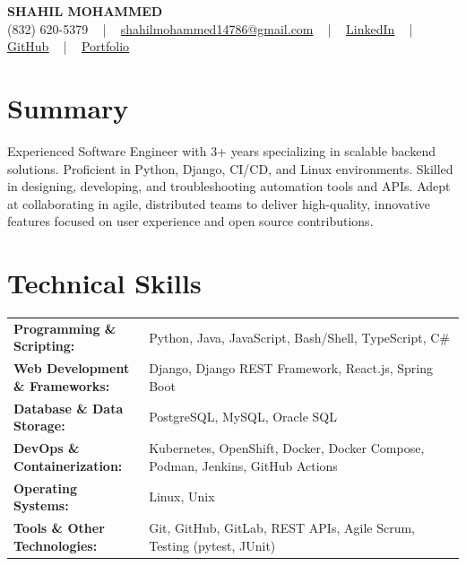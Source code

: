 \documentclass[letterpaper,11pt]{article}
\begin{document}
\begin{center}
    {\fontsize{14pt}{12pt}\selectfont \textbf{\MakeUppercase{Shahil Mohammed}}}\\ \vspace{2pt}
    \fontsize{10pt}{12pt}\selectfont (832) 620-5379 ~ | ~ \href{mailto:shahilmohammed14786@gmail.com}{shahilmohammed14786@gmail.com} ~ | ~  
    \href{https://www.linkedin.com/in/shahil-mohammed-9652931a1/}{\color{blue}\underline{LinkedIn}}  ~ | ~ 
    \href{https://github.com/freakbeast14}{\color{blue}\underline{GitHub}} ~ | ~ 
    \href{https://shahil-mohammed.netlify.app/}{\color{blue}\underline{Portfolio}}
    \vspace{-8pt}
\end{center}

\section{Summary}
\fontsize{9pt}{10pt}\selectfont
Experienced Software Engineer with 3+ years specializing in scalable backend solutions. Proficient in Python, Django, CI/CD, and Linux environments. Skilled in designing, developing, and troubleshooting automation tools and APIs. Adept at collaborating in agile, distributed teams to deliver high-quality, innovative features focused on user experience and open source contributions.
 \vspace{-5pt}
 
\section{Technical Skills}
        \vspace{-14pt}
        \begin{table}[h]
            \fontsize{9pt}{10pt}\selectfont
            \begin{tabular}{p{0.3\linewidth} p{0.7\linewidth}}
                \textbf{Programming \& Scripting:} & Python, Java, JavaScript, Bash/Shell, TypeScript, C\# \\
                \textbf{Web Development \& Frameworks:} & Django, Django REST Framework, React.js, Spring Boot \\
                \textbf{Database \& Data Storage:} & PostgreSQL, MySQL, Oracle SQL \\
                \textbf{DevOps \& Containerization:} & Kubernetes, OpenShift, Docker, Docker Compose, Podman, Jenkins, GitHub Actions \\
                \textbf{Operating Systems:} & Linux, Unix \\
                \textbf{Tools \& Other Technologies:} & Git, GitHub, GitLab, REST APIs, Agile Scrum, Testing (pytest, JUnit) \\
            \end{tabular}
        \end{table}
 \vspace{-15pt}
 
\end{document}
